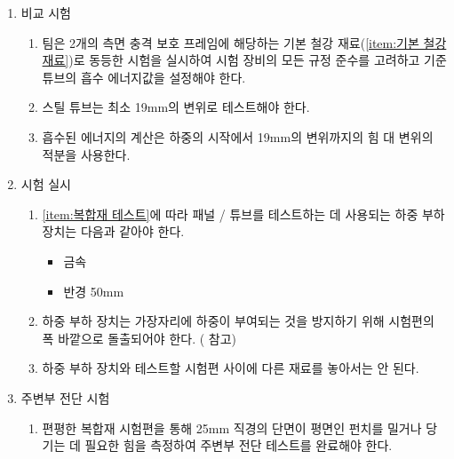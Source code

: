 \documentclass[final,a4paper,10pt]{report}
\begin{document}
\begin{enumerate}
\begin{enumerate}
      \item\label{rule:formula-technical.alternative-materials.testing.comparative-test} 비교 시험
        \begin{enumerate}
          \item\label{rule:formula-technical.alternative-materials.testing.comparative-test.baseline-steel-tube-test} 팀은 2개의 측면 충격 보호 프레임에 해당하는 기본 철강 재료(\ref{item:기본 철강 재료})로 동등한 시험을 실시하여 시험 장비의 모든 규정 준수를 고려하고 기준 튜브의 흡수 에너지값을 설정해야 한다.
          \item\label{rule:formula-technical.alternative-materials.testing.comparative-test.min-displacement-19mm} 스틸 튜브는 최소 19mm의 변위로 테스트해야 한다.
          \item\label{rule:formula-technical.alternative-materials.testing.comparative-test.energy-absorption-calculation} 흡수된 에너지의 계산은 하중의 시작에서 19mm의 변위까지의 힘 대 변위의 적분을 사용한다.
        \end{enumerate}

      \item\label{rule:formula-technical.alternative-materials.testing.load-device} 시험 실시
        \begin{enumerate}
          \item\label{rule:formula-technical.alternative-materials.testing.load-device.device-radius-50mm} \ref{item:복합재 테스트}에 따라 패널 / 튜브를 테스트하는 데 사용되는 하중 부하 장치는 다음과 같아야 한다.
            \begin{itemize}
                \item 금속
                \item 반경 50mm
            \end{itemize}

          \item\label{rule:formula-technical.alternative-materials.testing.load-device.protrudes-beyond-specimen} 하중 부하 장치는 가장자리에 하중이 부여되는 것을 방지하기 위해 시험편의 폭 바깥으로 돌출되어야 한다. ( 참고)
          \item\label{rule:formula-technical.alternative-materials.testing.load-device.no-intermediate-material} 하중 부하 장치와 테스트할 시험편 사이에 다른 재료를 놓아서는 안 된다.
        \end{enumerate}

      \item\label{rule:formula-technical.alternative-materials.testing.peripheral-shear-test} 주변부 전단 시험
        \begin{enumerate}
          \item\label{rule:formula-technical.alternative-materials.testing.peripheral-shear-test.punch-force-through-specimen} 편평한 복합재 시험편을 통해 25mm 직경의 단면이 평면인 펀치를 밀거나 당기는 데 필요한 힘을 측정하여 주변부 전단 테스트를 완료해야 한다.


\end{enumerate}
\end{enumerate}
\end{enumerate}
\end{document}
